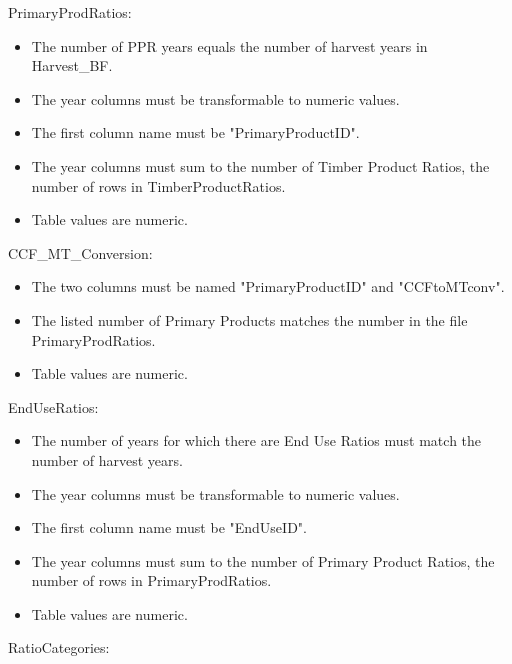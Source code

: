 \documentclass[
]{book}
\providecommand{\tightlist}{%
  \setlength{\itemsep}{0pt}\setlength{\parskip}{0pt}}
\begin{document}
PrimaryProdRatios:

\begin{itemize}
\tightlist
\item
  The number of PPR years equals the number of harvest years in Harvest\_BF.\\
\item
  The year columns must be transformable to numeric values.\\
\item
  The first column name must be "PrimaryProductID".\\
\item
  The year columns must sum to the number of Timber Product Ratios, the number of rows in TimberProductRatios.\\
\item
  Table values are numeric.
\end{itemize}

CCF\_MT\_Conversion:

\begin{itemize}
\tightlist
\item
  The two columns must be named "PrimaryProductID" and "CCFtoMTconv".\\
\item
  The listed number of Primary Products matches the number in the file PrimaryProdRatios.\\
\item
  Table values are numeric.
\end{itemize}

EndUseRatios:

\begin{itemize}
\tightlist
\item
  The number of years for which there are End Use Ratios must match the number of harvest years.\\
\item
  The year columns must be transformable to numeric values.\\
\item
  The first column name must be "EndUseID".\\
\item
  The year columns must sum to the number of Primary Product Ratios, the number of rows in PrimaryProdRatios.\\
\item
  Table values are numeric.
\end{itemize}

RatioCategories:
\end{document}
